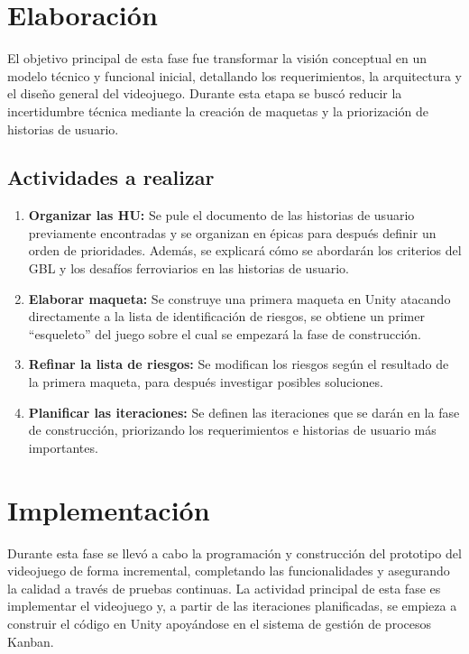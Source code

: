 \section{Elaboración}

El objetivo principal de esta fase fue transformar la visión conceptual en un modelo técnico y funcional inicial, detallando los requerimientos, la arquitectura y el diseño general del videojuego.
Durante esta etapa se buscó reducir la incertidumbre técnica mediante la creación de maquetas y la priorización de historias de usuario.

\subsection{Actividades a realizar}

\begin{enumerate}
  \item \textbf{Organizar las HU:} Se pule el documento de las historias de usuario previamente encontradas y se organizan en épicas para después definir un orden de prioridades. Además, se explicará cómo se abordarán los criterios del GBL y los desafíos ferroviarios en las historias de usuario.
  \item \textbf{Elaborar maqueta:} Se construye una primera maqueta en Unity atacando directamente a la lista de identificación de riesgos, se obtiene un primer “esqueleto” del juego sobre el cual se empezará la fase de construcción.
  \item \textbf{Refinar la lista de riesgos:} Se modifican los riesgos según el resultado de la primera maqueta, para después investigar posibles soluciones.
  \item \textbf{Planificar las iteraciones:} Se definen las iteraciones que se darán en la fase de construcción, priorizando los requerimientos e historias de usuario más importantes.
\end{enumerate}

\section{Implementación}

Durante esta fase se llevó a cabo la programación y construcción del prototipo del videojuego de forma incremental, completando las funcionalidades y asegurando la calidad a través de pruebas continuas. La actividad principal de esta fase es implementar el videojuego y, a partir de las iteraciones planificadas, se empieza a construir el código en Unity apoyándose en el sistema de gestión de procesos Kanban. 

